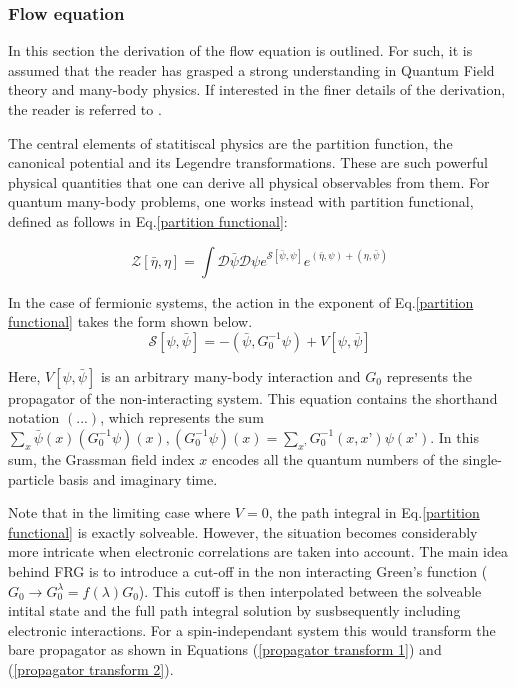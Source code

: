 \documentclass[12pt]{article}
\begin{document}
\subsubsection{Flow equation}
\label{subsubsec:Flow Equation}

In this section the derivation of the flow equation is outlined. For such, it is assumed that the reader has grasped a strong understanding in Quantum Field theory and many-body physics.
If interested in the finer details of the derivation, the reader is referred to \cite{metzner2012functional}. \par
\medskip
\noindent The central elements of statitiscal physics are the partition function, the canonical potential and its Legendre transformations. 
These are such powerful physical quantities that one can derive all physical observables from them.
For quantum many-body problems, one works instead with partition functional, defined as follows in Eq.\ref{partition functional}:

\begin{equation}\label{partition functional}
    \mathcal{Z}[\bar{\eta}, \eta] = \int \mathcal{D} \bar{\psi} \mathcal{D}\psi e^{\mathcal{S}[\bar{\psi}, \psi]}e^{(\bar{\eta}, \psi)+(\eta, \bar{\psi})}
\end{equation}

\noindent In the case of fermionic systems, the action in the exponent of Eq.\ref{partition functional} takes the form shown below.
\begin{equation} \label{action}
    \mathcal{S}[\psi, \bar{\psi}] = -(\bar{\psi}, G_0^{-1} \psi) + V[\psi, \bar{\psi}]
\end{equation}

\noindent Here, $V[\psi, \bar{\psi}]$ is an arbitrary many-body interaction and $G_0$ represents the propagator of the non-interacting system. 
This equation contains the shorthand notation $(...)$, which represents the sum $\sum_x \bar{\psi}(x)(G_0^{-1}\psi)(x), (G_0^{-1}\psi)(x) = \sum_{x’}G_0^{-1}(x,x’)\psi(x’)$. In this sum, the Grassman field index $x$ encodes all the quantum numbers of the single-particle basis and imaginary time.\par
\medskip

\noindent Note that in the limiting case where $V=0$, the path integral in Eq.\ref{partition functional} is exactly solveable. 
However, the situation becomes considerably more intricate when electronic correlations are taken into account.
The main idea behind FRG is to introduce a cut-off in the non interacting Green's function ($G_0 \rightarrow G_0^{\lambda} = f(\lambda)G_0$). 
This cutoff is then interpolated between the solveable intital state and the full path integral solution by susbsequently including electronic interactions. For a spin-independant system this would transform the 
bare propagator as shown in Equations (\ref{propagator transform 1}) and (\ref{propagator transform 2}). 
\end{document}
